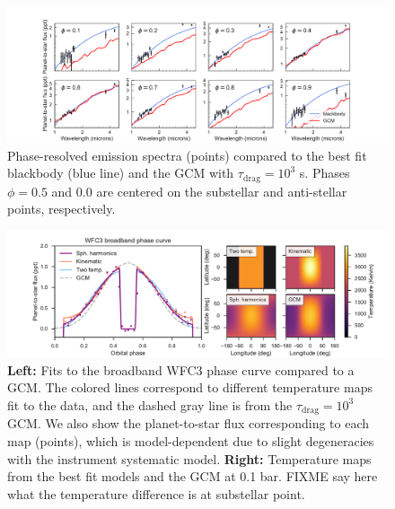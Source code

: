 \documentclass[twocolumn]{aastex61}
\begin{document}
\begin{figure}
\includegraphics[width = 1.0\textwidth]{Figures/emission_spectra.pdf}
\caption{Phase-resolved emission spectra (points) compared to the best fit blackbody (blue line) and the GCM with $\tau_\mathrm{drag} = 10^3$ s. Phases $\phi = 0.5$ and $0.0$ are centered on the substellar and anti-stellar points, respectively.}
\label{fig:spectra}
\end{figure}

\begin{figure}
\includegraphics[width = 1.0\textwidth]{Figures/hst_model_comparison.pdf}
\caption{\textbf{Left:} Fits to the broadband WFC3 phase curve compared to a GCM. The colored lines correspond to different temperature maps fit to the data, and the dashed gray line is from the $\tau_\mathrm{drag} = 10^3$ GCM. We also show the planet-to-star flux corresponding to each map (points), which is model-dependent due to slight degeneracies with the instrument systematic model.  \textbf{Right:} Temperature maps from the best fit models and the GCM at 0.1 bar. FIXME say here what the temperature difference is at substellar point.}
\label{fig:model_comparison}
\end{figure}
\end{document}
